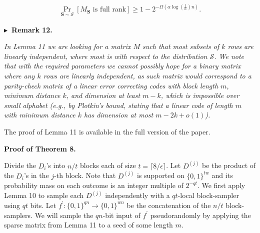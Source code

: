 \documentclass[10pt,a4paper]{article}
\begin{document}
\[\begin{gathered}
\Pr_{\boldsymbol{S}\sim\mathcal{S}}\left[\text{$M_{\boldsymbol{S}}$ is full rank}\right]\geq 1-2^{-\Omega(\alpha\log(\frac{1}{\alpha})n)}.
\end{gathered}\]







\par\medskip\noindent\textbf{
$\blacktriangleright$ Remark 12.
}\par



\emph{In Lemma 11 we are looking for a matrix $M$ such that most subsets of $k$ rows are linearly independent, where most is with respect to the distribution $\mathcal{S}$. We note that with the required parameters we cannot possibly hope for a binary matrix where any $k$ rows are linearly independent, as such matrix would correspond to a parity-check matrix of a linear error correcting codes with block length $m$, minimum distance $k$, and dimension at least $m-k$, which is impossible over small alphabet (e.g., by Plotkin’s bound, stating that a linear code of length $m$ with minimum distance $k$ has dimension at most $m-2k+o(1)$).}\par






The proof of Lemma 11 is available in the full version of the paper.\par





\par\medskip\noindent\textbf{Proof of Theorem 8.}\par




Divide the $D_{i}$’s into $n/t$ blocks each of size $t=\lceil 8/\epsilon\rceil$.
Let $D^{(j)}$ be the product of the $D_{i}$’s in the $j$-th block.
Note that $D^{(j)}$ is supported on $\{0,1\}^{tw}$ and its probability mass on each outcome is an integer multiple of $2^{-qt}$.
We first apply Lemma 10 to sample each $D^{(j)}$ independently with a $qt$-local block-sampler using $qt$ bits.
Let $f^{\prime}\colon\{0,1\}^{qn}\to\{0,1\}^{wn}$ be the concatenation of the $n/t$ block-samplers.
We will sample the $qn$-bit input of $f^{\prime}$ pseudorandomly by applying the sparse matrix from Lemma 11 to a seed of some length $m$.\par
\end{document}
